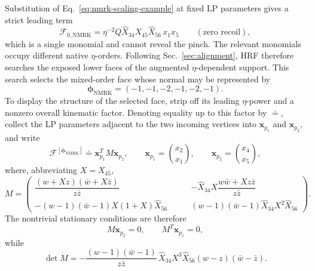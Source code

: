 \documentclass[a4paper,11pt]{article}
\begin{document}
Substitution of Eq.~\eqref{eq:nmrk-scaling-example} at fixed LP
parameters gives a strict leading term
\begin{equation}
 \mathcal F_{0,\mathrm{NMRK}}=
 \eta^{-2}Q\widehat X_{34}X_{45}\widehat X_{56}\,x_1x_5
 \qquad (\text{zero recoil}),
 \label{eq:nmrk-strict-leading-monomial}
\end{equation}
which is a single monomial and cannot reveal the pinch.  The relevant
monomials occupy different native \(\eta\)-orders.  Following
Sec.~\ref{sec:alignment}, HRF therefore searches the exposed lower faces of
the augmented \(\eta\)-dependent support.  This search selects the mixed-order
face whose normal may be represented by
\begin{equation}
 \boldsymbol\phi_{\mathrm{NMRK}}=(-1,-1,-2,-1,-2,-1).
 \label{eq:nmrk-alignment-vector}
\end{equation}
To display the structure of the selected face, strip off its leading
\(\eta\)-power and a nonzero overall kinematic factor.  Denoting equality up
to this factor by \(\doteq\), collect the LP parameters adjacent to the two
incoming vertices into \(\boldsymbol x_{p_1}\) and
\(\boldsymbol x_{p_2}\), and write
\begin{equation}
 \mathcal F^{[\boldsymbol\phi_{\mathrm{NMRK}}]}
 \doteq \boldsymbol x_{p_1}^{T}M\boldsymbol x_{p_2},
 \qquad
 \boldsymbol x_{p_1}=\binom{x_2}{x_1},\qquad
 \boldsymbol x_{p_2}=\binom{x_4}{x_5},
 \label{eq:nmrk-bilinear-face}
\end{equation}
where, abbreviating \(X=X_{45}\),
\begin{equation}
 M=
 \begin{pmatrix}
 \dfrac{(w+Xz)(\bar w+X\bar z)}{z\bar z}
 &-\widehat X_{34}X\dfrac{w\bar w+Xz\bar z}{z\bar z}
 \\[2mm]
 -(w-1)(\bar w-1)X(1+X)\widehat X_{56}\qquad
 &(w-1)(\bar w-1)\widehat X_{34}X^2\widehat X_{56}
 \end{pmatrix}.
 \label{eq:nmrk-bilinear-matrix}
\end{equation}
The nontrivial stationary conditions are therefore
\begin{equation}
 M\boldsymbol x_{p_2}=0,\qquad
 M^{T}\boldsymbol x_{p_1}=0,
 \label{eq:nmrk-bilinear-stationarity}
\end{equation}
while
\begin{equation}
 \det M=
 -\frac{(w-1)(\bar w-1)}{z\bar z}\,
 \widehat X_{34}X^3\widehat X_{56}
 (w-z)(\bar w-\bar z).
 \label{eq:nmrk-bilinear-determinant}
\end{equation}
\end{document}
